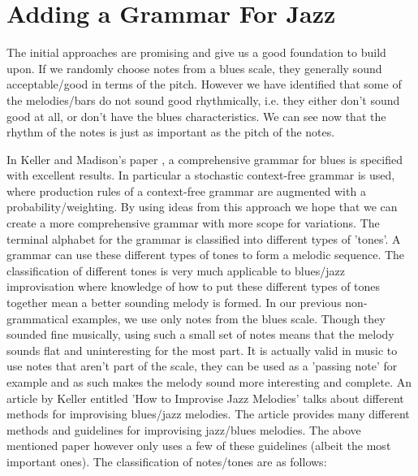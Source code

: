 \documentclass[pdftex,12pt,a4paper]{report}
\begin{document}
\section{Adding a Grammar For Jazz}
The initial approaches are promising and give us a good foundation to build upon. If we randomly choose notes from a blues scale, they generally sound acceptable/good in terms of the pitch. However we have identified that some of the melodies/bars do not sound good rhythmically, i.e. they either don't sound good at all, or don't have the blues characteristics. We can see now that the rhythm of the notes is just as important as the pitch of the notes. 

In Keller and Madison's paper \cite{keller07}, a comprehensive grammar for blues is specified with excellent results. In particular a stochastic context-free grammar is used, where production rules of a context-free grammar are augmented with a probability/weighting. By using ideas from this approach we hope that we can create a more comprehensive grammar with more scope for variations. The terminal alphabet for the grammar is classified into different types of 'tones'. A grammar can use these different types of tones to form a melodic sequence. The classification of different tones is very much applicable to blues/jazz improvisation where knowledge of how to put these different types of tones together mean a better sounding melody is formed. In our previous non-grammatical examples, we use only notes from the blues scale. Though they sounded fine musically, using such a small set of notes means that the melody sounds flat and uninteresting for the most part. It is actually valid in music to use notes that aren't part of the scale, they can be used as a 'passing note' for example and as such makes the melody sound more interesting and complete. An article by Keller entitled 'How to Improvise Jazz Melodies' \cite{jazzkeller} talks about different methods for improvising blues/jazz melodies. The article provides many different methods and guidelines for improvising jazz/blues melodies. The above mentioned paper \cite{keller07} however only uses a few of these guidelines (albeit the most important ones). The classification of notes/tones are as follows:
\end{document}
